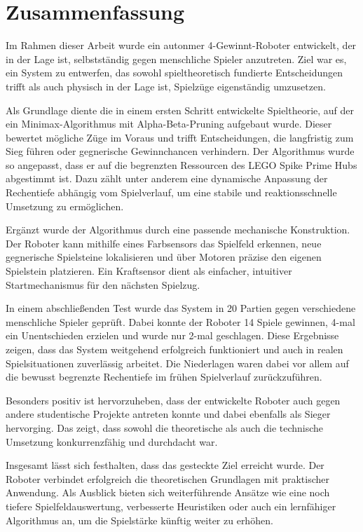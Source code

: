 \chapter{Zusammenfassung}
\label{cha:zusammenfassung}

Im Rahmen dieser Arbeit wurde ein autonmer 4-Gewinnt-Roboter entwickelt, der in der Lage ist, selbstständig gegen menschliche Spieler anzutreten. Ziel war es, ein System zu entwerfen, das sowohl spieltheoretisch fundierte Entscheidungen trifft als auch physisch in der Lage ist, Spielzüge eigenständig umzusetzen.

Als Grundlage diente die in einem ersten Schritt entwickelte Spieltheorie, auf der ein Minimax-Algorithmus mit Alpha-Beta-Pruning aufgebaut wurde. Dieser bewertet mögliche Züge im Voraus und trifft Entscheidungen, die langfristig zum Sieg führen oder gegnerische Gewinnchancen verhindern. Der Algorithmus wurde so angepasst, dass er auf die begrenzten Ressourcen des LEGO Spike Prime Hubs abgestimmt ist. Dazu zählt unter anderem eine dynamische Anpassung der Rechentiefe abhängig vom Spielverlauf, um eine stabile und reaktionsschnelle Umsetzung zu ermöglichen.

Ergänzt wurde der Algorithmus durch eine passende mechanische Konstruktion. Der Roboter kann mithilfe eines Farbsensors das Spielfeld erkennen, neue gegnerische Spielsteine lokalisieren und über Motoren präzise den eigenen Spielstein platzieren. Ein Kraftsensor dient als einfacher, intuitiver Startmechanismus für den nächsten Spielzug.

In einem abschließenden Test wurde das System in 20 Partien gegen verschiedene menschliche Spieler geprüft. Dabei konnte der Roboter 14 Spiele gewinnen, 4-mal ein Unentschieden erzielen und wurde nur 2-mal geschlagen. Diese Ergebnisse zeigen, dass das System weitgehend erfolgreich funktioniert und auch in realen Spielsituationen zuverlässig arbeitet. Die Niederlagen waren dabei vor allem auf die bewusst begrenzte Rechentiefe im frühen Spielverlauf zurückzuführen.

Besonders positiv ist hervorzuheben, dass der entwickelte Roboter auch gegen andere studentische Projekte antreten konnte und dabei ebenfalls als Sieger hervorging. Das zeigt, dass sowohl die theoretische als auch die technische Umsetzung konkurrenzfähig und durchdacht war.

Insgesamt lässt sich festhalten, dass das gesteckte Ziel erreicht wurde. Der Roboter verbindet erfolgreich die theoretischen Grundlagen mit praktischer Anwendung. Als Ausblick bieten sich weiterführende Ansätze wie eine noch tiefere Spielfeldauswertung, verbesserte Heuristiken oder auch ein lernfähiger Algorithmus an, um die Spielstärke künftig weiter zu erhöhen.

